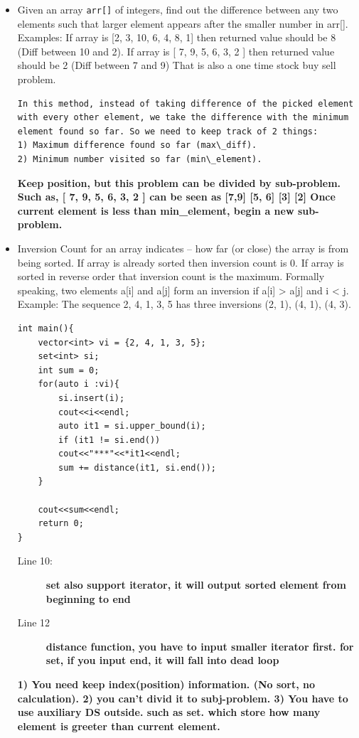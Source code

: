 \documentclass[a4paper,11pt,twoside]{book}
\begin{document}
\begin{itemize}
\item Given an array \texttt{arr[]} of integers, find out the difference between any two elements such that larger element appears after the smaller number in arr[]. Examples: If array is [2, 3, 10, 6, 4, 8, 1] then returned value should be 8 (Diff between 10 and 2). If array is [ 7, 9, 5, 6, 3, 2 ] then returned value should be 2 (Diff between 7 and 9)
That is also a one time stock buy sell problem.
\begin{lstlisting}[breaklines]
In this method, instead of taking difference of the picked element with every other element, we take the difference with the minimum element found so far. So we need to keep track of 2 things:
1) Maximum difference found so far (max\_diff).
2) Minimum number visited so far (min\_element).
\end{lstlisting}
\textbf{Keep position, but this problem can be divided by sub-problem. Such as, [ 7, 9, 5, 6, 3, 2 ] can be seen as [7,9] [5, 6] [3] [2]  Once current element is less than min\_element, begin a new sub-problem.}


\item Inversion Count for an array indicates -- how far (or close) the array is from being sorted. If array is already sorted then inversion count is 0. If array is sorted in reverse order that inversion count is the maximum. Formally speaking, two elements a[i] and a[j] form an inversion if a[i] > a[j] and i < j. Example:
The sequence 2, 4, 1, 3, 5 has three inversions (2, 1), (4, 1), (4, 3).

\begin{lstlisting}[breaklines]
int main(){
	vector<int> vi = {2, 4, 1, 3, 5};
	set<int> si;
	int sum = 0;
	for(auto i :vi){
		si.insert(i);
		cout<<i<<endl;
		auto it1 = si.upper_bound(i);
		if (it1 != si.end())
		cout<<"***"<<*it1<<endl;
		sum += distance(it1, si.end());
	}
	
	cout<<sum<<endl;
	return 0;
}
\end{lstlisting}
\begin{description}
	\item[Line 10:] \textbf{set also support iterator, it will output sorted element from beginning to end }
	\item[Line 12] \textbf{distance function, you have to input smaller iterator first. for set, if you input end, it will fall into dead loop}
\end{description}

\textbf{1) You need keep index(position) information. (No sort, no calculation).  2) you can't divid it to subj-problem. 3) You have to use auxiliary DS outside. such as set. which store how many element is greeter than current element.  }



\end{itemize}
\end{document}
